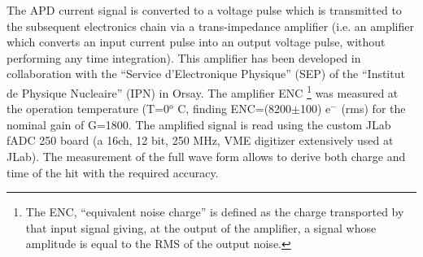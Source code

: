 
The APD current signal is converted to a
voltage pulse which is transmitted to the subsequent
electronics chain via a trans-impedance
amplifier (i.e. an amplifier which converts an
input current pulse into an output voltage
pulse, without performing any time integration).
This amplifier has been developed in
collaboration with the “Service d’Electronique
Physique” (SEP) of the “Institut de Physique
Nucleaire” (IPN) in Orsay. The amplifier ENC \footnote{The ENC, “equivalent noise charge” is defined as the
charge transported by that input signal giving, at the
output of the amplifier, a signal whose amplitude is equal
to the RMS of the output noise.} was measured at the operation temperature (T=0$^o$ C,  finding ENC=(8200$\pm$100) e$^-$ (rms) for the nominal gain of G=1800. 
The amplified signal is read using the custom JLab fADC  250 board (a 16ch, 12 bit, 250 MHz, VME digitizer extensively used at JLab). The measurement of the full wave form allows to derive both charge and time of the hit with the required   accuracy.

